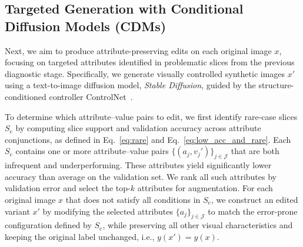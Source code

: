 \documentclass[10pt]{article} %
\newcommand{\controlnet}{ControlNet\xspace}
\begin{document}


\subsection{Targeted Generation with Conditional Diffusion Models (CDMs)}

Next, we aim to produce attribute-preserving edits on each original image \(x\), focusing on targeted attributes identified in problematic slices from the previous diagnostic stage. Specifically, we generate visually controlled synthetic images \(x'\) using a text-to-image diffusion model, \textit{Stable Diffusion}, guided by the structure-conditioned controller \controlnet{}~\citep{zhang2023adding}. 

To determine which attribute–value pairs to edit, we first identify rare-case slices \(S_e\) by computing slice support and validation accuracy across attribute conjunctions, as defined in Eq.~\eqref{eq:rare} and Eq.~\eqref{eq:low_acc_and_rare}. Each \(S_e\) contains one or more attribute–value pairs \(\{(a_j, v_j')\}_{j \in \mathcal{J}}\) that are both infrequent and underperforming. These attributes yield significantly lower accuracy than average on the validation set. 
We rank all such attributes by validation error and select the top-\(k\) attributes for augmentation. For each original image \(x\) that does not satisfy all conditions in \(S_e\), we construct an edited variant \(x'\) by modifying the selected attributes \(\{a_j\}_{j \in \mathcal{J}}\) to match the error-prone configuration defined by \(S_e\), while preserving all other visual characteristics and keeping the original label unchanged, i.e., \(y(x') = y(x)\).
\end{document}

